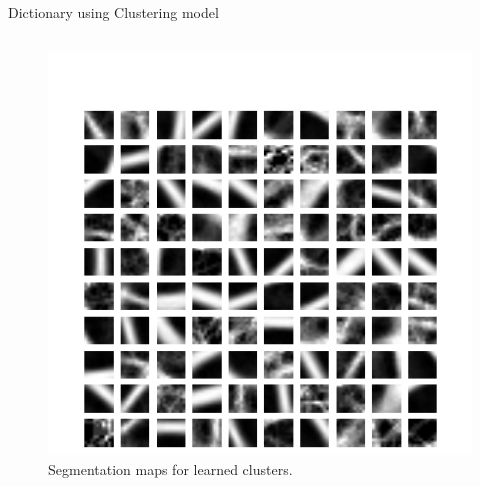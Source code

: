 \documentclass{beamer}
\begin{document}
\begin{frame}{Dictionary using Clustering model}
\begin{columns}[c]
					\begin{figure}
						\includegraphics[width=\textwidth]{framework/gtclusters1.png}
						\caption{Segmentation maps for learned clusters.}
						\label{fig:gtclusters}
					\end{figure}					
			\end{columns}


	\end{frame}
	
\end{document}
